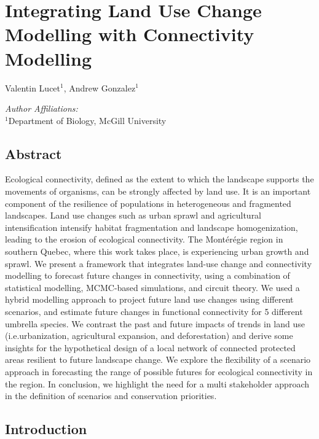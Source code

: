 \chapter{Integrating Land Use Change Modelling with Connectivity Modelling}
\begin{center}
{Valentin Lucet$^{1}$, Andrew Gonzalez$^{1}$}\\
\end{center}
\textit{Author Affiliations:}\\
\normalsize{$^{1}$Department of Biology, McGill University}\\
\section{Abstract}

Ecological connectivity, defined as the extent to which the landscape supports the movements of organisms, can be strongly affected by land use. It is an important component of the resilience of populations in heterogeneous and fragmented landscapes. Land use changes such as urban sprawl and agricultural intensification intensify habitat fragmentation and landscape homogenization, leading to the erosion of ecological connectivity. The Montérégie region in southern Quebec, where this work takes place, is experiencing urban growth and sprawl. We present a framework that integrates land-use change and connectivity modelling to forecast future changes in connectivity, using a combination of statistical modelling, MCMC-based simulations, and circuit theory. We used a hybrid modelling approach to project future land use changes using different scenarios, and estimate future changes in functional connectivity for 5 different umbrella species. We contrast the past and future impacts of trends in land use (i.e.urbanization, agricultural expansion, and deforestation) and derive some insights for the hypothetical design of a local network of connected protected areas resilient to future landscape change. We explore the flexibility of a scenario approach in forecasting the range of possible futures for ecological connectivity in the region. In conclusion, we highlight the need for a multi stakeholder approach in the definition of scenarios and conservation priorities.\\

\section{Introduction}

